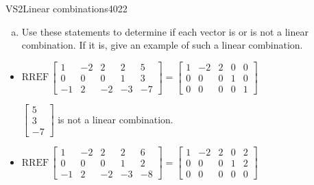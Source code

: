 \begin{exercise}{VS2}{Linear combinations}{4022}
\begin{exerciseStatement}
\begin{enumerate}[(a)]
\begin{itemize}
 
\end{itemize}

     
\item  

 Use these statements to determine if each vector is or is not a linear combination. If it is, give an example of such a linear combination. 

 
\end{enumerate}

     \end{exerciseStatement}
 \begin{exerciseAnswer} 

\begin{itemize}
\item  

 \(
\mathrm{RREF}\, \left[\begin{array}{cccc|c}
1 & -2 & 2 & 2 & 5 \\
0 & 0 & 0 & 1 & 3 \\
-1 & 2 & -2 & -3 & -7
\end{array}\right] = \left[\begin{array}{cccc|c}
1 & -2 & 2 & 0 & 0 \\
0 & 0 & 0 & 1 & 0 \\
0 & 0 & 0 & 0 & 1
\end{array}\right]
                        \) 

 

 \(\left[\begin{array}{c}
5 \\
3 \\
-7
\end{array}\right]\) is not a linear combination. 

 
\item  

 \(
\mathrm{RREF}\, \left[\begin{array}{cccc|c}
1 & -2 & 2 & 2 & 6 \\
0 & 0 & 0 & 1 & 2 \\
-1 & 2 & -2 & -3 & -8
\end{array}\right] = \left[\begin{array}{cccc|c}
1 & -2 & 2 & 0 & 2 \\
0 & 0 & 0 & 1 & 2 \\
0 & 0 & 0 & 0 & 0
\end{array}\right]
                        \) 

 


\end{itemize}
\end{exerciseAnswer}
\end{exercise}
